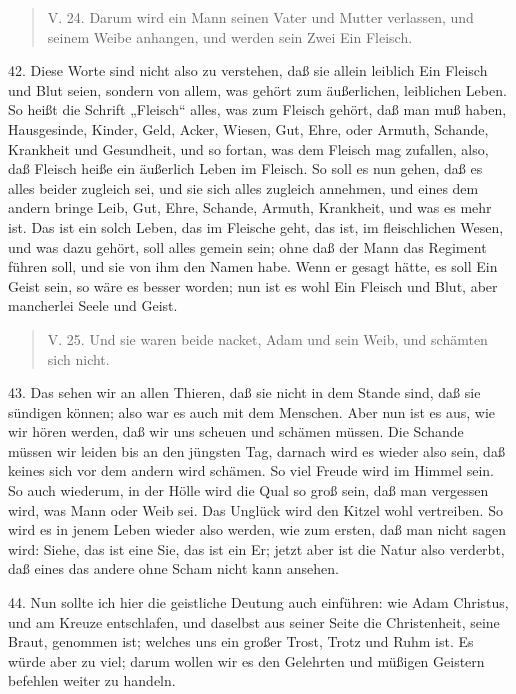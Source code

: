 \begin{quote}
V. 24. Darum wird ein Mann seinen Vater und Mutter verlassen, und seinem Weibe anhangen, und werden sein Zwei Ein Fleisch.
\end{quote}

42. Diese Worte sind nicht also zu verstehen, daß sie allein leiblich Ein Fleisch und Blut seien, sondern von allem, was gehört zum äußerlichen, leiblichen Leben. So heißt die Schrift „Fleisch“ alles, was zum Fleisch gehört, daß man muß haben, Hausgesinde, Kinder, Geld, Acker, Wiesen, Gut, Ehre, oder Armuth, Schande, Krankheit und Gesundheit, und so fortan, was dem Fleisch mag zufallen, also, daß Fleisch heiße ein äußerlich Leben im Fleisch. So soll es nun gehen, daß es alles beider zugleich sei, und sie sich alles zugleich annehmen, und eines dem andern bringe Leib, Gut, Ehre, Schande, Armuth, Krankheit, und was es mehr ist. Das ist ein solch Leben, das im Fleische geht, das ist, im fleischlichen Wesen, und was dazu gehört, soll alles gemein sein; ohne daß der Mann das Regiment führen soll, und sie von ihm den Namen habe. Wenn er gesagt hätte, es soll Ein Geist sein, so wäre es besser worden; nun ist es wohl Ein Fleisch und Blut, aber mancherlei Seele und Geist.

\begin{quote}
V. 25. Und sie waren beide nacket, Adam und sein Weib, und schämten sich nicht.
\end{quote}

43. Das sehen wir an allen Thieren, daß sie nicht in dem Stande sind, daß sie sündigen können; also war es auch mit dem Menschen. Aber nun ist es aus, wie wir hören werden, daß wir uns scheuen und schämen müssen. Die Schande müssen wir leiden bis an den jüngsten Tag, darnach wird es wieder also sein, daß keines sich vor dem andern wird schämen. So viel Freude wird im Himmel sein. So auch wiederum, in der Hölle wird die Qual so groß sein, daß man vergessen wird, was Mann oder Weib sei. Das Unglück wird den Kitzel wohl vertreiben. So wird es in jenem Leben wieder also werden, wie zum ersten, daß man nicht sagen wird: Siehe, das ist eine Sie, das ist ein Er; jetzt aber ist die Natur also verderbt, daß eines das andere ohne Scham nicht kann ansehen.

44. Nun sollte ich hier die geistliche Deutung auch einführen: wie Adam Christus, und am Kreuze entschlafen, und daselbst aus seiner Seite die Christenheit, seine Braut, genommen ist; welches uns ein großer Trost, Trotz und Ruhm ist. Es würde aber zu viel; darum wollen wir es den Gelehrten und müßigen Geistern befehlen weiter zu handeln.


